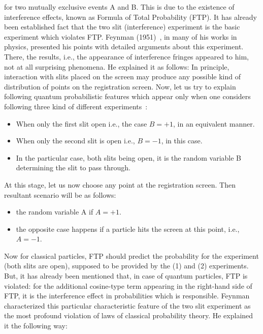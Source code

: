 \documentclass[review]{elsarticle}
\begin{document}
																								 
for two mutually exclusive events A and B. 
This is due to the existence of interference effects, known as Formula of Total Probability (FTP). It has already been established fact that the two slit (interference) experiment is the basic experiment which violates FTP. Feynman (1951)~\cite{feynman1966feynman}, in many of his works in physics, presented his points with detailed arguments about this experiment. There, the results, i.e., the appearance of interference fringes appeared to him, not at all surprising phenomena. He explained it as follows:
In principle, interaction with slits placed on the screen may produce any possible kind of distribution of points on the registration screen. Now, let us try to explain following quantum probabilistic features which appear only when one considers following three kind of different experiments~\cite{conte2009mental}: %

\begin{itemize}
\item When only the first slit open i.e., the case $B=+1$, in an equivalent manner.
\item When only the second slit is open i.e., $B= -1$, in this case.
\item In the particular case, both slits being open, it is the random variable B determining the slit to pass through.
\end{itemize}

At this stage, let us now choose any point at the registration screen.  Then resultant scenario will be as follows: 
\begin{itemize}
\item the random variable A if  $A= +1$.
\item the opposite case happens if a particle hits the screen at this point, i.e., $A= -1$.
\end{itemize}

Now for classical particles, FTP should predict the probability for the  experiment (both slits are open), supposed to be provided by the (1) and (2) experiments. But, it has already been mentioned that, in case of quantum particles, FTP is violated: for the additional cosine-type term appearing in the right-hand side of FTP, it is the interference effect in probabilities which is responsible. Feynman characterized this particular characteristic feature of the two slit experiment as the most profound violation of laws of classical probability theory. He explained it the following way: 
\end{document}
